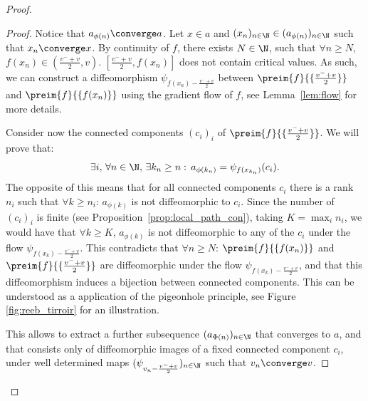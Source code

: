 \begin{proof}
\begin{proof}

Notice that $a_{\phi(n)}\converge a$. Let $x\in a$ and $(x_n)_{n\in\N}\in(a_{\phi(n)})_{n\in\N}$ such that $x_n\converge x$. 
By continuity of $f$, there exists $N\in\N$, such that $\forall n\geq N$, $f(x_n)\in(\frac{v^-+v}{2},v)$.
$[\frac{v^-+v}{2},f(x_n)]$ does not contain critical values. As such, we can construct a diffeomorphism $\psi_{f(x_n)-\frac{v^-+v}{2}}$ between $\preim{f}{\{\frac{v^-+v}{2}\}}$ and $\preim{f}{\{f(x_n)\}}$ using the gradient flow of $f$, see Lemma~\ref{lem:flow} for more details. 

Consider now the connected components $(c_i)_i$ of $\preim{f}{\{\frac{v^-+v}{2}\}}$. We will prove that: $$ \exists i,\,\forall n\in\N,\,\exists k_n\geq n:\,a_{\phi(k_n)}=\psi_{f(x_{k_n})}(c_i) .$$
The opposite of this means that for all connected components $c_i$ there is a rank $n_i$ such that $\forall k\geq n_i$: $a_{\phi(k)}$ is not diffeomorphic to $c_i$. Since the number of $(c_i)_i$ is finite (see Proposition~\ref{prop:local_path_con}), taking $K=\max_i n_i$, we would have that $\forall k\geq K$, $a_{\phi(k)}$ is not diffeomorphic to any of the $c_i$ under the flow $\psi_{f(x_k)-\frac{v^-+v}{2}}$. This contradicts that $\forall n\geq N$: $\preim{f}{\{f(x_n)\}}$ and $\preim{f}{\{\frac{v^-+v}{2}\}}$ are diffeomorphic under the flow $\psi_{f(x_k)-\frac{v^-+v}{2}}$, and that this diffeomorphism induces a bijection between connected components. This can be understood as a application of the pigeonhole principle, see Figure \ref{fig:reeb_tirroir} for an illustration. 

This allows to extract a further subsequence $(a_{\Phi(n)})_{n\in\N}$ that converges to $a$, and that consists only of diffeomorphic images of a fixed connected component $c_i$, under well determined maps $(\psi_{v_n-\frac{v^-+v}{2}})_{n\in\N}$ such that $v_n\converge v$.
 

\end{proof}
\end{proof}
